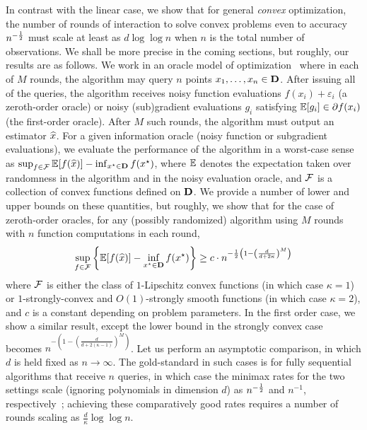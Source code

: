 In contrast with the linear case, we show that for general \emph{convex}
optimization, the number of rounds of interaction to solve convex problems
even to accuracy $n^{-\frac{1}{2}}$ must scale at least as $d \log \log n$ when
$n$ is the total number of observations. We shall be more precise in the
coming sections, but roughly, our results are as follows.  We work in an
oracle model of optimization~\citep{NemirovskiYu83} where in each of $M$
rounds, the algorithm may query $n$ points $x_1,
\ldots, x_n \in \mathbf{D}$. After issuing all of the queries, the algorithm
receives noisy function evaluations $f(x_i) + \varepsilon_i$ (a zeroth-order
oracle) or noisy (sub)gradient evaluations $g_i$ satisfying $\mathbb{E}[g_i] \in
\partial f(x_i)$ (the first-order oracle). After $M$ such rounds, the
algorithm must output an estimator $\widehat{x}$. For a given information
oracle (noisy function or subgradient evaluations), we evaluate the
performance of the algorithm in a worst-case sense as $\sup_{f \in \mathcal{F}}
\mathbb{E}[f(\widehat{x})] - \inf_{x^\star \in \mathbf{D}} f(x^\star)$, where $\mathbb{E}$ denotes the
expectation taken over randomness in the algorithm and in the noisy
evaluation oracle, and $\mathcal{F}$ is a collection of convex functions defined
on $\mathbf{D}$. We provide a number of lower and upper bounds on these
quantities, but roughly, we show that for the case of zeroth-order oracles,
for any (possibly randomized) algorithm using $M$ rounds with $n$ function
computations in each round,
\begin{equation}
  \label{eqn:minmax-rate}
  \sup_{f \in \mathcal{F}}
  \left\{\mathbb{E}[f(\widehat{x})] - \inf_{x^\star \in \mathbf{D}} f(x^\star)\right\}
  \ge c \cdot
  n^{-\frac{1}{2} \left(1 - \left(\frac{d}{d + 2\kappa}\right)^M\right)}
\end{equation}
where $\mathcal{F}$ is either the class of $1$-Lipschitz convex functions (in
which case $\kappa = 1$) or $1$-strongly-convex and $O(1)$-strongly smooth
functions (in which case $\kappa = 2$), and $c$ is a constant depending on
problem parameters. In the first order case, we show a similar result,
except the lower bound in the strongly convex case becomes $n^{-(1 -
  (\frac{d}{d + 2(\kappa-1)})^M)}$. Let us perform an asymptotic comparison,
in which $d$ is held fixed as $n \to \infty$. The
gold-standard in such cases is for fully sequential algorithms that receive
$n$ queries, in which case the minimax rates for the two settings scale
(ignoring polynomials in dimension $d$) as $n^{-\frac{1}{2}}$ and $n^{-1}$,
respectively~\citep{AgarwalBaRaWa12,Shamir13}; achieving these comparatively
good rates requires a number of rounds scaling as $\frac{d}{\kappa} \log
\log n$.


